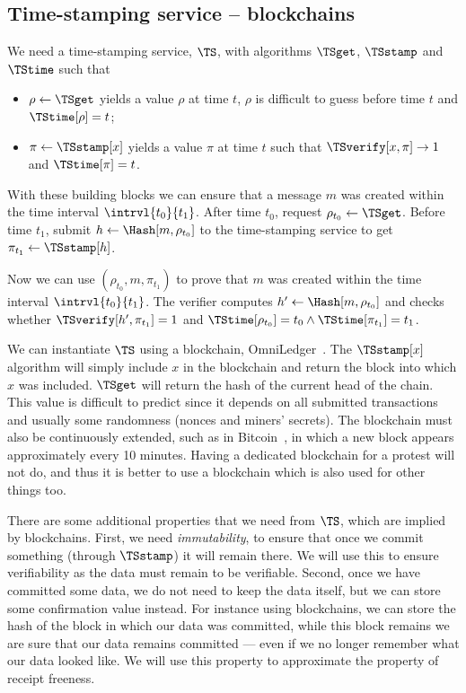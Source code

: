\subsection{Time-stamping service -- blockchains}%
\label{StorageProperties}


We need a time-stamping service, \(\TS\), with algorithms \(\TSget\), 
\(\TSstamp\) and \(\TStime\) such that
\begin{itemize}
  \item \(\rho \gets \TSget\) yields a value \(\rho\) at time \(t\), \(\rho\) is difficult to guess before time \(t\) and \(\TStime[\rho] = t\);
  \item \(\pi\gets \TSstamp[x]\) yields a value \(\pi\) at time \(t\) such that \(\TSverify[x, \pi]\to 1\) and \(\TStime[\pi] = t\).
\end{itemize}

With these building blocks we can ensure that a message \(m\) was created within 
the time interval \(\intrvl{t_0}{t_1}\).
After time \(t_0\), request \(\rho_{t_0}\gets \TSget\).
Before time \(t_1\), submit \(h\gets \Hash[m, \rho_{t_0}]\) to the time-stamping service to get \(\pi_{t_1}\gets \TSstamp[h]\).

Now we can use \((\rho_{t_0}, m, \pi_{t_1})\) to prove that \(m\) was created 
within the time interval \(\intrvl{t_0}{t_1}\).
The verifier computes \(h'\gets \Hash[m, \rho_{t_0}]\) and checks whether \(\TSverify[h', \pi_{t_1}] = 1\) and \(\TStime[\rho_{t_0}] = t_0\land \TStime[\pi_{t_1}] = t_1\).

We can instantiate \(\TS\) using a blockchain, \eg OmniLedger~\cite{OmniLedger}.
The \(\TSstamp[x]\) algorithm will simply include \(x\) in the blockchain and return the block into which \(x\) was included.
\(\TSget\) will return the hash of the current head of the chain.
This value is difficult to predict since it depends on all submitted transactions and usually some randomness (\eg nonces and miners' secrets).
The blockchain must also be continuously extended, such as in Bitcoin~\cite{Bitcoin}, in which a new block appears approximately every 10 minutes.
Having a dedicated blockchain for a protest will not do, and thus it is better to use a blockchain which is also used for other things too.

There are some additional properties that we need from \(\TS\), which are implied by blockchains.
First, we need \emph{immutability}, to ensure that once we commit something (through \(\TSstamp\)) it will remain there.
We will use this to ensure verifiability as the data must remain to be verifiable.
Second, once we have committed some data, we do not need to keep the data itself, but we can store some confirmation value instead.
For instance using blockchains, we can store the hash of the block in which our data was committed, while this block remains we are sure that our data remains committed --- even if we no longer remember what our data looked like.
We will use this property to approximate the property of receipt freeness.
